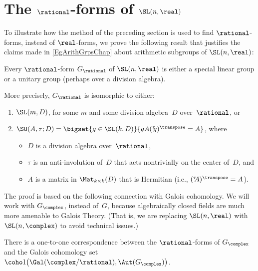 \section{The \texorpdfstring{$\rational$}{Q}-forms of 
	\texorpdfstring{$\SL(\lowercase{n},\real)$}{SL(n,R)}} 
\label{QFormsOfSLnSect}

To illustrate how the method of the preceding section is used to find $\rational$-forms, instead of $\real$-forms, we prove the following result that justifies the claims made in \cref{EgArithGrpsChap}
 about arithmetic subgroups of $\SL(n,\real)$:

\begin{thm} \label{QformsOfSLn}
Every\/ $\rational$-form $G_\rational$ of\/ $\SL(n,\real)$ is either a special linear group or a unitary group\/ \textup(perhaps over a division algebra\/\textup).
\end{thm}

\begin{rem}
More precisely, $G_\rational$ is isomorphic to either:
	\begin{enumerate}
	\item $\SL(m,D)$, for some $m$ and some division algebra~$D$ over~$\rational$,
	or
	\item $\SU(A, \tau ; D) = 
		 \bigset{ g \in \SL ( k, D ) }{ g A ({}^\tau \!\! g)^\transpose = A }$, where
		\begin{itemize} 
		\item $D$ is a division algebra over~$\rational$,
		\item $\tau$ is an anti-involution of~$D$ that acts nontrivially on the center of~$D$,
		and
		\item $A$ is a matrix in $\Mat_{k \times k}(D)$ that is Hermitian (i.e., $({}^\tau \!\! A)^\transpose = A$).
		\end{itemize}
	\end{enumerate}
\end{rem}

The proof is based on the following connection with Galois cohomology. 
We will work with $G_\complex$, instead of~$G$, because algebraically closed fields are much more amenable to Galois Theory. (That is, we are replacing $\SL(n,\real)$ with $\SL(n,\complex)$ to avoid technical issues.)

\begin{prop} \label{GQ<>H1}
There is a one-to-one correspondence between the\/ $\rational$-forms of $G_\complex$ and the Galois cohomology set\/ $\coho1\bigl( \Gal(\complex/\rational), \Aut(G_\complex) \bigr)$.
\end{prop}


